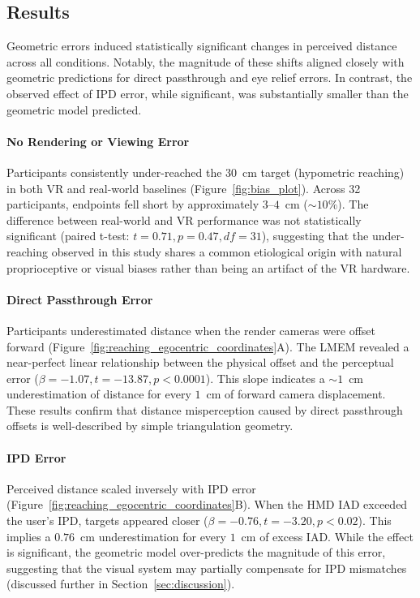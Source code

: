 \subsection{Results}
\label{sec:exp1results}
Geometric errors induced statistically significant changes in perceived distance across all conditions. Notably, the magnitude of these shifts aligned closely with geometric predictions for direct passthrough and eye relief errors. In contrast, the observed effect of IPD error, while significant, was substantially smaller than the geometric model predicted.

\paragraph{No Rendering or Viewing Error}
Participants consistently under-reached the $30$~cm target (hypometric reaching) in both VR and real-world baselines (Figure~\ref{fig:bias_plot}). Across 32 participants, endpoints fell short by approximately $3$--$4$~cm ($\sim10\%$). The difference between real-world and VR performance was not statistically significant (paired t-test: $t = 0.71, p = 0.47, df = 31$), suggesting that the under-reaching observed in this study shares a common etiological origin with natural proprioceptive or visual biases rather than being an artifact of the VR hardware.

\paragraph{Direct Passthrough Error}
Participants underestimated distance when the render cameras were offset forward (Figure~\ref{fig:reaching_egocentric_coordinates}A). The LMEM revealed a near-perfect linear relationship between the physical offset and the perceptual error ($\beta = -1.07, t = -13.87, p < 0.0001$). This slope indicates a $\sim1$~cm underestimation of distance for every $1$~cm of forward camera displacement. These results confirm that distance misperception caused by direct passthrough offsets is well-described by simple triangulation geometry.

\paragraph{IPD Error}
Perceived distance scaled inversely with IPD error (Figure~\ref{fig:reaching_egocentric_coordinates}B). When the HMD IAD exceeded the user's IPD, targets appeared closer ($\beta = -0.76, t = -3.20, p < 0.02$). This implies a $0.76$~cm underestimation for every $1$~cm of excess IAD. While the effect is significant, the geometric model over-predicts the magnitude of this error, suggesting that the visual system may partially compensate for IPD mismatches (discussed further in Section~\ref{sec:discussion}).


